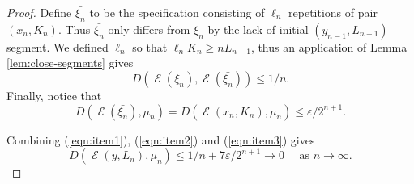 \documentclass{amsart}
\theoremstyle{definition}
\DeclareMathOperator{\Emp}{\mathcal{E}}%
\newcommand{\eps}{\varepsilon}
\begin{document}
\begin{proof}
Define $\bar{\xi_n}$ to be the specification consisting of $\ell_n$ repetitions of pair $(x_n, K_n)$. Thus $\bar{\xi_n}$ only differs from $\xi_n$ by the lack of initial $(y_{n-1}, L_{n-1})$ segment. We defined $\ell_n$ so that $\ell_n K_n \ge n L_{n-1}$, thus an application of Lemma \ref{lem:close-segments} gives
\begin{equation} \label{eqn:item2}
D(\Emp(\xi_n), \Emp(\bar{\xi_n})) \le 1/n.
\end{equation}
Finally, notice that
\begin{equation} \label{eqn:item3}
D(\Emp(\bar{\xi_n}), \mu_n) = D(\Emp(x_n, K_n), \mu_n) \le \eps / 2^{n+1}.
\end{equation}

Combining (\ref{eqn:item1}), (\ref{eqn:item2}) and (\ref{eqn:item3}) gives
\begin{equation} \label{eqn:emp_measure_Ln}
D(\Emp(y, L_n), \mu_n) \le 1/n + 7 \eps/2^{n+1} \to 0 \quad \textrm{ as } n \to \infty.
\end{equation}


\end{proof}
\end{document}
